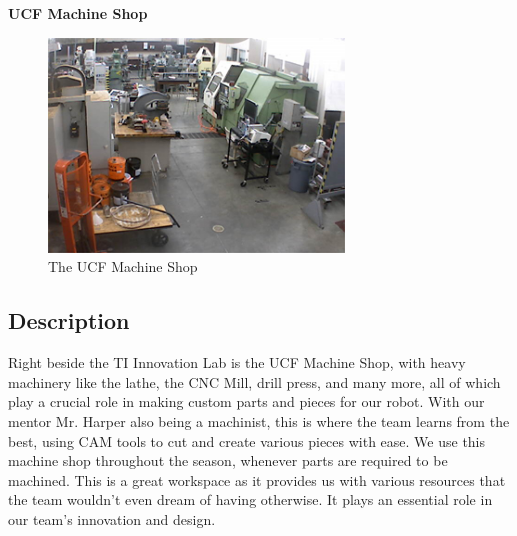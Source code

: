 \textbf {\large UCF Machine Shop}
 \begin{figure}[h!]
 \centering
   \includegraphics[width=0.7\textwidth, angle=0]{Workspaces/machine_shop.jpg}
  \caption{The UCF Machine Shop}
 \end{figure}

\subsection*{Description}
Right beside the TI Innovation Lab is the UCF Machine Shop, with heavy machinery like the lathe, the CNC Mill, drill press, and many more, all of which play a crucial role in making custom parts and pieces for our robot. With our mentor Mr. Harper also being a machinist, this is where the team learns from the best, using CAM tools to cut and create various pieces with ease. We use this machine shop throughout the season, whenever parts are required to be machined. This is a great workspace as it provides us with various resources that the team wouldn't even dream of having otherwise. It plays an essential role in our team's innovation and design. 